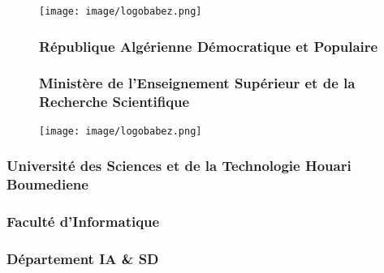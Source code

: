 \documentclass[a4paper,12pt]{report}
\begin{document}
\thispagestyle{empty}
\begin{center}
    \begin{figure}[h]
        \begin{minipage}{0.15\textwidth}
            \centering
            \texttt{[image: image/logobabez.png]}
        \end{minipage}
        \hspace*{0.9cm}
        \begin{minipage}{0.6\textwidth}
            \centering
            \subsubsection*{\textbf{République Algérienne Démocratique et Populaire}}
            \subsubsection*{\textnormal{Ministère de l'Enseignement Supérieur et de la Recherche Scientifique}}
        \end{minipage}
        \begin{minipage}{0.15\textwidth}
            \centering
            \texttt{[image: image/logobabez.png]}
        \end{minipage}
    \end{figure}

    \vspace{20pt}
    \subsubsection*{\textbf{Université des Sciences et de la Technologie Houari Boumediene}}
    \subsubsection*{\textnormal{Faculté d'Informatique}}
    \subsubsection*{\textnormal{Département IA \& SD}}
\end{center}
\end{document}
